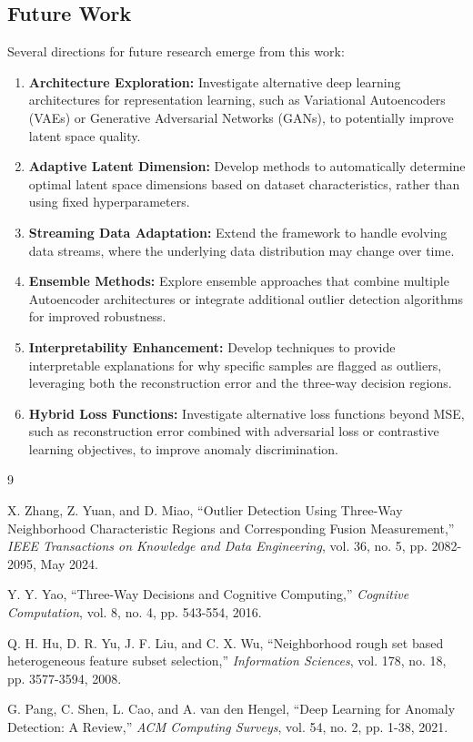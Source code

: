 \documentclass[12pt,a4paper]{article}
\begin{document}
\subsection{Future Work}

Several directions for future research emerge from this work:

\begin{enumerate}
\item \textbf{Architecture Exploration:} Investigate alternative deep learning architectures for representation learning, such as Variational Autoencoders (VAEs) or Generative Adversarial Networks (GANs), to potentially improve latent space quality.

\item \textbf{Adaptive Latent Dimension:} Develop methods to automatically determine optimal latent space dimensions based on dataset characteristics, rather than using fixed hyperparameters.

\item \textbf{Streaming Data Adaptation:} Extend the framework to handle evolving data streams, where the underlying data distribution may change over time.

\item \textbf{Ensemble Methods:} Explore ensemble approaches that combine multiple Autoencoder architectures or integrate additional outlier detection algorithms for improved robustness.

\item \textbf{Interpretability Enhancement:} Develop techniques to provide interpretable explanations for why specific samples are flagged as outliers, leveraging both the reconstruction error and the three-way decision regions.

\item \textbf{Hybrid Loss Functions:} Investigate alternative loss functions beyond MSE, such as reconstruction error combined with adversarial loss or contrastive learning objectives, to improve anomaly discrimination.
\end{enumerate}

\newpage

\begin{thebibliography}{9}

X. Zhang, Z. Yuan, and D. Miao, ``Outlier Detection Using Three-Way Neighborhood Characteristic Regions and Corresponding Fusion Measurement,'' \textit{IEEE Transactions on Knowledge and Data Engineering}, vol. 36, no. 5, pp. 2082-2095, May 2024.

Y. Y. Yao, ``Three-Way Decisions and Cognitive Computing,'' \textit{Cognitive Computation}, vol. 8, no. 4, pp. 543-554, 2016.

Q. H. Hu, D. R. Yu, J. F. Liu, and C. X. Wu, ``Neighborhood rough set based heterogeneous feature subset selection,'' \textit{Information Sciences}, vol. 178, no. 18, pp. 3577-3594, 2008.

G. Pang, C. Shen, L. Cao, and A. van den Hengel, ``Deep Learning for Anomaly Detection: A Review,'' \textit{ACM Computing Surveys}, vol. 54, no. 2, pp. 1-38, 2021.

\end{thebibliography}
\end{document}
